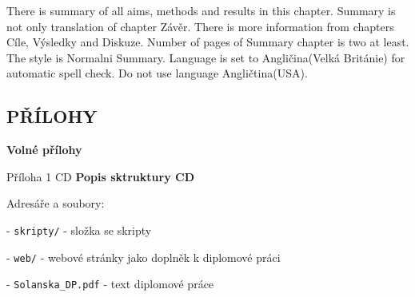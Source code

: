 \documentclass{thesisKGI}
\begin{document}
    \begin{summary}
      There is summary of all aims, methods and results in this chapter.
      Summary is not only translation of chapter Závěr. There is more
      information from chapters Cíle, Výsledky and Diskuze. Number of
      pages of Summary chapter is two at least. The style is Normalni
      Summary. Language is set to Angličina(Velká Británie) for automatic
      spell check. Do not use language Angličtina(USA).
    \end{summary}

    \newpage
    \vspace*{180pt}
    \begin{center}
    \section*{PŘÍLOHY}
    \end{center}
    \vspace*{\fill}

    \newpage
    \begin{prilohy}
      \textbf{Volné přílohy}

      Příloha 1 CD \newline
      \newline
      \textbf{Popis sktruktury CD}

        Adresáře a soubory:

        - \texttt{skripty\slash} - složka se skripty

        - \texttt{web\slash} - webové stránky jako doplněk k diplomové práci

        - \texttt{Solanska\_DP.pdf} - text diplomové práce

      \vspace*{\fill}
  \end{prilohy}

  
\end{document}
